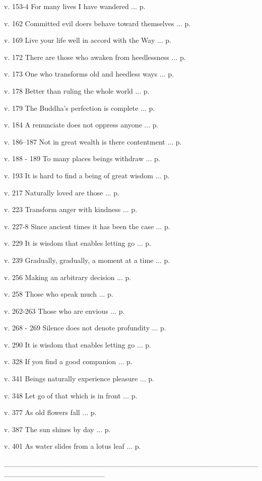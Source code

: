 \documentclass[a4paper,portrait,12pt]{article}
\begin{document}
v. 153-4 For many lives I have wandered ... p.


v. 162 Committed evil doers behave toward themselves ... p.


v. 169 Live your life well in accord with the Way ... p.


v. 172 There are those who awaken from heedlessness ... p.


v. 173 One who transforms old and heedless ways ... p.


v. 178 Better than ruling the whole world ... p.


v. 179 The Buddha's perfection is complete ... p.


v. 184 A renunciate does not oppress anyone ... p.


v. 186--187 Not in great wealth is there contentment ... p.


v. 188 - 189 To many places beings withdraw ... p.


v. 193 It is hard to find a being of great wisdom ... p.


v. 217 Naturally loved are those ... p. 


v. 223 Transform anger with kindness ... p.


v. 227-8 Since ancient times it has been the case ... p.


v. 229 It is wisdom that enables letting go ... p.


v. 239 Gradually, gradually, a moment at a time ... p.


v. 256 Making an arbitrary decision ... p.


v. 258 Those who speak much ... p.


v. 262-263 Those who are envious ... p.


v. 268 - 269 Silence does not denote profundity ... p.


v. 290 It is wisdom that enables letting go ... p.


v. 328 If you find a good companion ... p.


v. 341 Beings naturally experience pleasure ... p.


v. 348 Let go of that which is in front ... p.


v. 377 As old flowers fall ... p.


v. 387 The sun shines by day ... p.


v. 401 As water slides from a lotus leaf ... p.





\_\_\_\_\_\_\_\_\_\_\_\_\_\_\_\_\_\_\_\_\_\_\_\_\_\_\_\_\_\_\_\_\_\_\_\_\_\_\_\_\_\_\_\_\_\_\_\_\_\_\_\_\_\_\_\_\_\_\_\_\_\_\_\_\_\_\_
\end{document}
